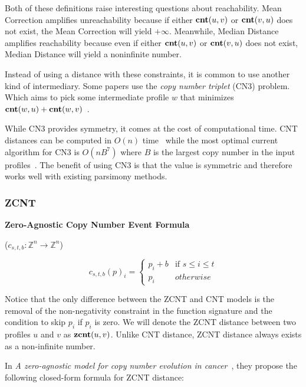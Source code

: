 \vspace{15pt}

Both of these definitions raise interesting questions about reachability. Mean Correction amplifies unreachability because if either $\textbf{cnt}(u, v)$ or $\textbf{cnt}(v, u)$ does not exist, the Mean Correction will yield $+\infty$. Meanwhile, Median Distance amplifies reachability because even if either $\textbf{cnt}(u, v)$ or $\textbf{cnt}(v, u)$ does not exist, Median Distance will yield a noninfinite number. 

Instead of using a distance with these constraints, it is common to use another kind of intermediary. Some papers use the {\it copy number triplet\/} (CN3) problem. Which aims to pick some intermediate profile $w$ that minimizes $\textbf{cnt}(w, u) + \textbf{cnt} (w, v)$~\cite{triplet_algorithm}. 

While CN3 provides symmetry, it comes at the cost of computational time. CNT distances can be computed in $O(n)$ time~\cite{linear_cnt} while the most optimal current algorithm for CN3 is $O(nB^7)$ where $B$ is the largest copy number in the input profiles~\cite{triplet_algorithm}. The benefit of using CN3 is that the value is symmetric and therefore works well with existing parsimony methods.

\subsubsection{ZCNT}

{\bf Zero-Agnostic Copy Number Event Formula} 

($c_{s, t, b}: \mathbb{Z}^n \rightarrow \mathbb{Z}^n$) 

\begin{equation}
    c_{s, t, b}{(p)}_i = \begin{cases}
        p_i + b & \text{if } s \leq i \leq t \\ 
        p_i & otherwise
    \end{cases}
\end{equation}

Notice that the only difference between the ZCNT and CNT models is the removal of the non-negativity constraint in the function signature and the condition to skip $p_i$ if $p_i$ is zero. We will denote the ZCNT distance between two profiles $u$ and $v$ as $\textbf{zcnt}(u, v)$. Unlike CNT distance, ZCNT distance always exists as a non-infinite number. 

In {\it A zero-agnostic model for copy number evolution in cancer\/}~\cite{zcnt_paper}, they propose the following closed-form formula for ZCNT distance: 

